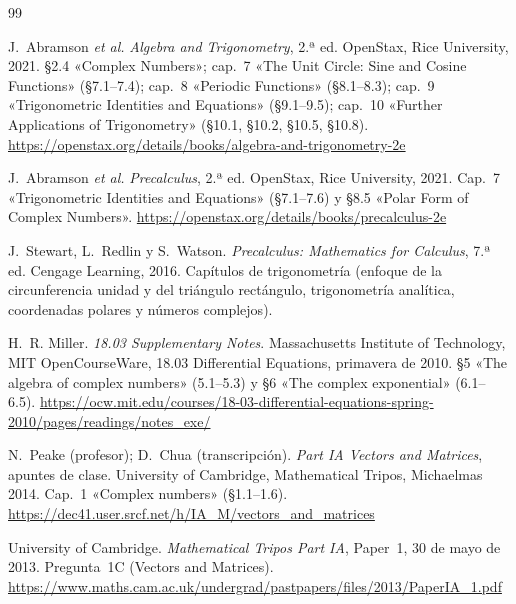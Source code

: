 \begin{thebibliography}{99}
\small

J.~Abramson \emph{et al.}
\newblock \emph{Algebra and Trigonometry}, 2.ª ed.
\newblock OpenStax, Rice University, 2021.
\newblock §2.4 «Complex Numbers»; cap.~7 «The Unit Circle: Sine and Cosine Functions» (§7.1--7.4); cap.~8 «Periodic Functions» (§8.1--8.3); cap.~9 «Trigonometric Identities and Equations» (§9.1--9.5); cap.~10 «Further Applications of Trigonometry» (§10.1, §10.2, §10.5, §10.8).
\newblock \url{https://openstax.org/details/books/algebra-and-trigonometry-2e}

J.~Abramson \emph{et al.}
\newblock \emph{Precalculus}, 2.ª ed.
\newblock OpenStax, Rice University, 2021.
\newblock Cap.~7 «Trigonometric Identities and Equations» (§7.1--7.6) y §8.5 «Polar Form of Complex Numbers».
\newblock \url{https://openstax.org/details/books/precalculus-2e}

J.~Stewart, L.~Redlin y S.~Watson.
\newblock \emph{Precalculus: Mathematics for Calculus}, 7.ª ed.
\newblock Cengage Learning, 2016.
\newblock Capítulos de trigonometría (enfoque de la circunferencia unidad y del triángulo rectángulo, trigonometría analítica, coordenadas polares y números complejos).

H.~R. Miller.
\newblock \emph{18.03 Supplementary Notes}.
\newblock Massachusetts Institute of Technology, MIT OpenCourseWare, 18.03 Differential Equations, primavera de 2010.
\newblock §5 «The algebra of complex numbers» (5.1--5.3) y §6 «The complex exponential» (6.1--6.5).
\newblock \url{https://ocw.mit.edu/courses/18-03-differential-equations-spring-2010/pages/readings/notes_exe/}

N.~Peake (profesor); D.~Chua (transcripción).
\newblock \emph{Part IA Vectors and Matrices}, apuntes de clase.
\newblock University of Cambridge, Mathematical Tripos, Michaelmas 2014.
\newblock Cap.~1 «Complex numbers» (§1.1--1.6).
\newblock \url{https://dec41.user.srcf.net/h/IA_M/vectors_and_matrices}

University of Cambridge.
\newblock \emph{Mathematical Tripos Part IA}, Paper~1, 30 de mayo de 2013.
\newblock Pregunta~1C (Vectors and Matrices).
\newblock \url{https://www.maths.cam.ac.uk/undergrad/pastpapers/files/2013/PaperIA_1.pdf}


\end{thebibliography}
